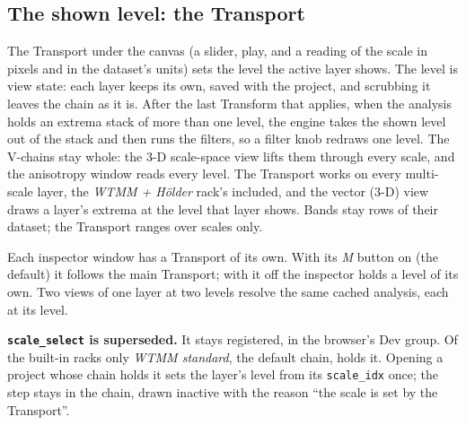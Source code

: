 \documentclass[10pt]{article}
\newcommand{\dev}[1]{\texttt{#1}}
\begin{document}
\subsection*{The shown level: the Transport}\label{sec:transport}
The Transport under the canvas (a slider, play, and a reading of the scale in pixels and in the
dataset's units) sets the level the active layer shows. The level is view state: each layer
keeps its own, saved with the project, and scrubbing it leaves the chain as it is. After the
last Transform that applies, when the analysis holds an extrema stack of more than one level,
the engine takes the shown level out of the stack and then runs the filters, so a filter knob
redraws one level. The V-chains stay whole: the 3-D scale-space view lifts them through every
scale, and the anisotropy window reads every level. The Transport works on every multi-scale
layer, the \emph{WTMM + H\"older} rack's included, and the vector (3-D) view draws a layer's
extrema at the level that layer shows. Bands stay rows of their dataset; the Transport ranges
over scales only.

Each inspector window has a Transport of its own. With its \emph{M} button on (the default) it
follows the main Transport; with it off the inspector holds a level of its own. Two views of
one layer at two levels resolve the same cached analysis, each at its level.

\textbf{\dev{scale\_select} is superseded.} It stays registered, in the browser's Dev group. Of
the built-in racks only \emph{WTMM standard}, the default chain, holds it. Opening a project
whose chain holds it sets the layer's level from its \texttt{scale\_idx} once; the step stays
in the chain, drawn inactive with the reason ``the scale is set by the Transport''.
\end{document}
